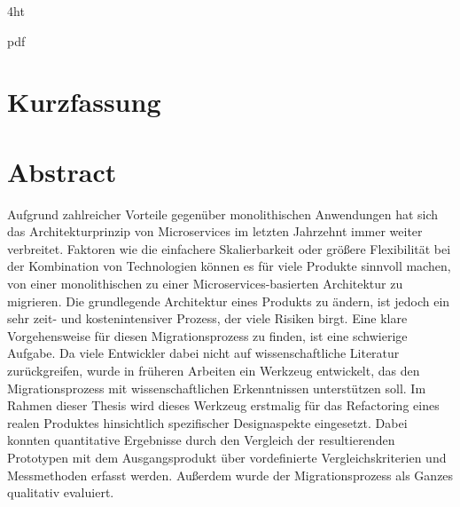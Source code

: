 \documentclass[
  ngerman,
  a4paper,  %
  twoside,  %
  bibliography=totoc,
  headsepline,
  cleardoublepage=empty,
  parskip=half,
  draft=false
]{scrbook}
\begin{document}
\iftex4ht
  \Configure{$}{\PicMath}{\EndPicMath}{}

  {pdf}
  {%
  }
\fi



\Titelblatt

\pagestyle{preamble}
\renewcommand*{\chapterpagestyle}{preamble}



\ifdeutsch
  \section*{Kurzfassung}
\else
  \section*{Abstract}
\fi

Aufgrund zahlreicher Vorteile gegenüber monolithischen Anwendungen hat sich das Architekturprinzip von Microservices im letzten Jahrzehnt immer weiter verbreitet.
Faktoren wie die einfachere Skalierbarkeit oder größere Flexibilität bei der Kombination von Technologien können es für viele Produkte sinnvoll machen, von einer monolithischen zu einer Microservices-basierten Architektur zu migrieren.
Die grundlegende Architektur eines Produkts zu ändern, ist jedoch ein sehr zeit- und kostenintensiver Prozess, der viele Risiken birgt.
Eine klare Vorgehensweise für diesen Migrationsprozess zu finden, ist eine schwierige Aufgabe.
Da viele Entwickler dabei nicht auf wissenschaftliche Literatur zurückgreifen, wurde in früheren Arbeiten ein Werkzeug entwickelt, das den Migrationsprozess mit wissenschaftlichen Erkenntnissen unterstützen soll.
Im Rahmen dieser Thesis wird dieses Werkzeug erstmalig für das Refactoring eines realen Produktes hinsichtlich spezifischer Designaspekte eingesetzt.
Dabei konnten quantitative Ergebnisse durch den Vergleich der resultierenden Prototypen mit dem Ausgangsprodukt über vordefinierte Vergleichskriterien und Messmethoden erfasst werden.
Außerdem wurde der Migrationsprozess als Ganzes qualitativ evaluiert.
\end{document}
